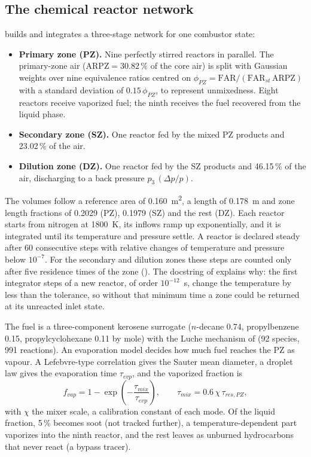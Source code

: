 \documentclass[a4paper,11pt]{article}
\begin{document}
\subsection{The chemical reactor network}\label{sec:crn}
 builds and integrates a
three-stage network for one combustor state:
\begin{itemize}
\item \textbf{Primary zone (PZ).} Nine perfectly stirred reactors in parallel. The primary-zone
  air ($\mathrm{ARPZ} = 30.82\,\%$ of the core air) is split with Gaussian weights over nine
  equivalence ratios centred on $\phi_{PZ} = \mathrm{FAR}/(\mathrm{FAR}_{st}\,\mathrm{ARPZ})$
  with a standard deviation of $0.15\,\phi_{PZ}$, to represent unmixedness. Eight reactors
  receive vaporized fuel; the ninth receives the fuel recovered from the liquid phase.
\item \textbf{Secondary zone (SZ).} One reactor fed by the mixed PZ products and 23.02\,\% of
  the air.
\item \textbf{Dilution zone (DZ).} One reactor fed by the SZ products and 46.15\,\% of the air,
  discharging to a back pressure $p_3\,(\Delta p/p)$.
\end{itemize}
The volumes follow a reference area of \SI{0.160}{m^2}, a length of \SI{0.178}{m} and zone
length fractions of 0.2029 (PZ), 0.1979 (SZ) and the rest (DZ). Each reactor starts from
nitrogen at \SI{1800}{K}, its inflows ramp up exponentially, and it is integrated until its
temperature and pressure settle. A reactor is declared steady after 60 consecutive steps with
relative changes of temperature and pressure below $10^{-7}$. For the secondary and dilution zones
these steps are counted only after five residence times of the zone ().
The docstring of  explains why: the first integrator steps of a
new reactor, of order $10^{-12}$~s, change the temperature by less than the tolerance, so
without that minimum time a zone could be returned at its unreacted inlet state.

The fuel is a three-component kerosene surrogate ($n$-decane 0.74, propylbenzene 0.15,
propylcyclohexane 0.11 by mole) with the Luche mechanism of 
(92 species, 991 reactions). An evaporation model decides how much fuel reaches the PZ as vapour.
A Lefebvre-type correlation gives the Sauter mean diameter, a droplet law gives the evaporation
time $\tau_{evp}$, and the vaporized fraction is
\begin{equation}
  f_{vap} = 1 - \exp\!\left(-\frac{\tau_{mix}}{\tau_{evp}}\right), \qquad
  \tau_{mix} = 0.6\,\chi\,\tau_{res,PZ},
\end{equation}
with $\chi$ the mixer scale, a calibration constant of each mode. Of the liquid fraction,
5\,\% becomes soot (not tracked further), a temperature-dependent part vaporizes into the ninth
reactor, and the rest leaves as unburned hydrocarbons that never react (a bypass tracer).
\end{document}
